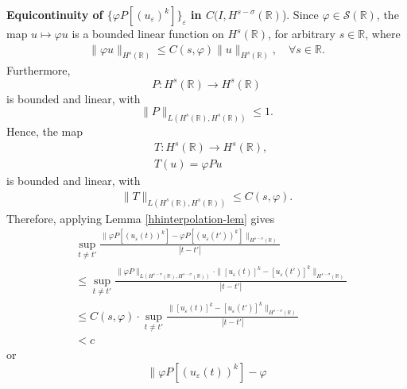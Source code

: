 \documentclass[12pt,reqno]{amsart}
\newcommand{\nin}{\noindent}
\newcommand{\rr}{\mathbb{R}}
\newcommand{\ee}{\varepsilon}
\newcommand{\vp}{\varphi}
\theoremstyle{plain}  %
\theoremstyle{definition}
\begin{document}
\begin{appendices}
		\vskip0.1in
		\nin
		{\bf  Equicontinuity of $\{ \varphi P [(u_\ee)^k]\}_\ee$  in $C(I,
		H^{s-\sigma}(\rr)$}).
		Since $\varphi \in \mathcal{S}(\rr)$, the map $u \mapsto \vp u$
		is a bounded linear function on $H^s(\rr)$, for arbitrary $s \in
		\rr$, where  
		\begin{equation}
			\begin{split}
				\|\varphi u\|_{H^s(\rr)} \le C(s, \varphi)
				\|u\|_{H^s(\rr)}, \quad \forall s\in \rr.
				\label{hhschwartz-estimate}
			\end{split}
		\end{equation}
		Furthermore, $$P: H^s(\rr) \to H^s(\rr)$$ is bounded and linear,
		with 
		\begin{equation}
			\label{operator-normaa}
			\|P\|_{L(H^s(\rr), H^s(\rr))} \le 1.
		\end{equation}
		Hence, the map 
		\begin{equation}
			\label{the-map}
			\begin{split}
			& T: H^s(\rr) \to H^s(\rr),
			\\
			& T(u) = \vp P u 
		\end{split}
	\end{equation}
	is bounded and linear, with 
	\begin{equation}
		\begin{split}
			\|T\|_{L(H^s(\rr), H^s(\rr))} \le C(s, \vp).
			\label{op-norm-product}
		\end{split}
	\end{equation}
	Therefore, applying Lemma
		\ref{hhinterpolation-lem} gives 
		\begin{equation*}
			\begin{split}
			\label{hhequic-1}
			& \sup_{t \neq t'} \frac {\| \varphi P [(u_\ee(t))^k] - \varphi
			P [(u_\ee(t'))^k] \|_{H^{s -
			\sigma  }(\rr)}}{|t - t'|}
			\\
			& \le \sup_{t \neq t'}  \frac { \|\vp P \|_{L(H^{s-\sigma}(\rr),
			H^{s-\sigma}(\rr))} \cdot \|   [u_\ee(t)]^k  - 
			[u_\ee(t')]^k \|_{H^{s -
			\sigma }(\rr)}}{|t - t'|}
			\\
			& \le C(s, \vp) \cdot \sup_{t \neq t'}  \frac { \|   [u_\ee(t)]^k  - 
			[u_\ee(t')]^k \|_{H^{s -
			\sigma }(\rr)}}{|t - t'|}
			\\
			&< c
		\end{split}
		\end{equation*}
		or
		\begin{equation*}
			\label{hhequic-2}
			\|\varphi P [(u_\ee(t))^k] - \varphi

\end{equation*}
\end{appendices}
\end{document}
